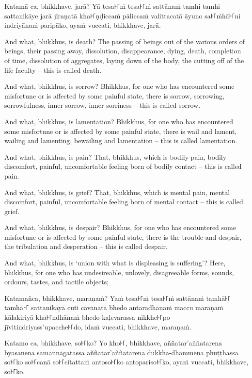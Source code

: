 Katamā ca, bhikkhave, jarā? Yā tesa꜔꜒ṁ tesa꜔꜒ṁ sattānaṁ tamhi tamhi sattanikāye jarā
jīraṇatā kha꜔꜒ṇḍiccaṁ pāliccaṁ valittacatā āyuno sa꜔꜒ṁhā꜔꜒ni indriyānaṁ paripāko, ayaṁ
vuccati, bhikkhave, jarā.

\englishPage

And what, bhikkhus, is death? The passing of beings out of the various orders of
beings, their passing away, dissolution, disappearance, dying, death, completion
of time, dissolution of aggregates, laying down of the body, the cutting off of
the life faculty -- this is called death.

And what, bhikkhus, is sorrow? Bhikkhus, for one who has encountered some
misfortune or is affected by some painful state, there is sorrow, sorrowing,
sorrowfulness, inner sorrow, inner sorriness -- this is called sorrow.

And what, bhikkhus, is lamentation? Bhikkhus, for one who has encountered some
misfortune or is affected by some painful state, there is wail and lament,
wailing and lamenting, bewailing and lamentation -- this is called lamentation.

And what, bhikkhus, is pain? That, bhikkhus, which is bodily pain, bodily
discomfort, painful, uncomfortable feeling born of bodily contact -- this is
called pain.

And what, bhikkhus, is grief? That, bhikkhus, which is mental pain, mental
discomfort, painful, uncomfortable feeling born of mental contact -- this is
called grief.

And what, bhikkhus, is despair? Bhikkhus, for one who has encountered some
misfortune or is affected by some painful state, there is the trouble and
despair, the tribulation and desperation -- this is called despair.

And what, bhikkhus, is `union with what is displeasing is suffering'? Here,
bhikkhus, for one who has undesireable, unlovely, disagreeable forms, sounds,
ordours, tastes, and tactile objects;

\paliPage

Katamañca, bhikkhave, maraṇaṁ? Yaṁ tesa꜔꜒ṁ tesa꜔꜒ṁ sattānaṁ tamhā꜔꜒ tamhā꜔꜒ sattanikāyā
cuti cavanatā bhedo antaradhānaṁ maccu maraṇaṁ kālakiriyā kha꜔꜒ndhānaṁ bhedo
kaḷevarassa nikkhe꜔꜒po jīvitindriyass'upacche꜔꜒do, idaṁ vuccati, bhikkhave, maraṇaṁ.

Katamo ca, bhikkhave, so꜔꜒ko? Yo kho꜔꜒, bhikkhave, aññatar'aññatarena byasanena
samannāgatassa aññatar'aññatarena dukkha-dhammena phuṭṭhassa so꜔꜒ko so꜔꜒canā
so꜔꜒citattaṁ antoso꜔꜒ko antopariso꜔꜒ko, ayaṁ vuccati, bhikkhave, so꜔꜒ko.

